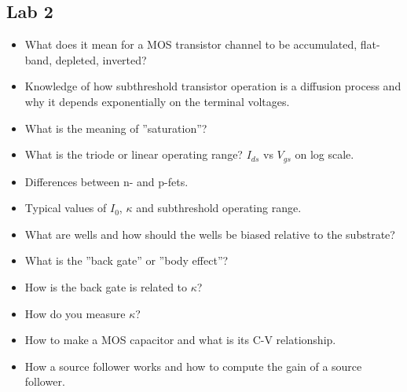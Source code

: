 \documentclass[main]{subfiles}
\begin{document}
\subsection{Lab 2}
\begin{itemize}
\item What does it mean for a MOS transistor channel to be accumulated, flat-band, depleted, inverted? 
\item Knowledge of how subthreshold transistor operation is a diffusion process and why it depends exponentially on the terminal voltages. 
\item What is the meaning of ”saturation”?
\item What is the triode or linear operating range? $I_{ds}$ vs $V_{gs}$ on log scale. 
\item Differences between n- and p-fets. 
\item Typical values of $I_0$, $\kappa$ and subthreshold operating range. 
\item What are wells and how should the wells be biased relative to the substrate? 
\item What is the ”back gate” or ”body effect”? 
\item How is the back gate is related to $\kappa$? 
\item How do you measure $\kappa$? 
\item How to make a MOS capacitor and what is its C-V relationship. 
\item How a source follower works and how to compute the gain of a source follower.
\end{itemize}
\end{document}
